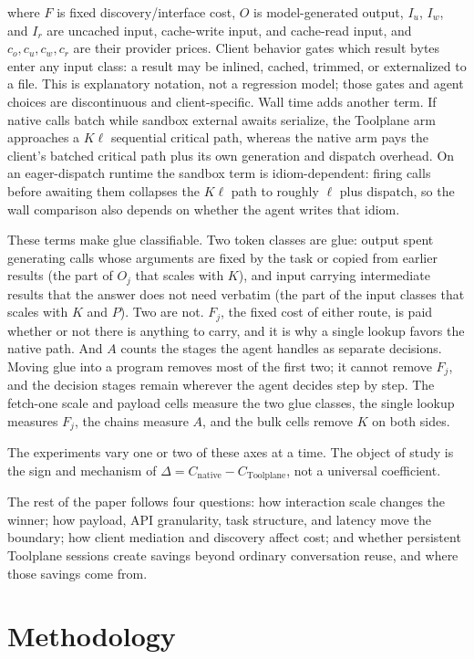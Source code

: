 \documentclass[10pt,twocolumn]{article}
\begin{document}
where $F$ is fixed discovery/interface cost, $O$ is model-generated output,
$I_u$, $I_w$, and $I_r$ are uncached input, cache-write input, and cache-read
input, and $c_o,c_u,c_w,c_r$ are their provider prices.  Client behavior gates
which result bytes enter any input class: a result may be inlined, cached,
trimmed, or externalized to a file.  This is explanatory notation, not a
regression model; those gates and agent choices are discontinuous and
client-specific.  Wall time adds another term.  If native calls batch while
sandbox external awaits serialize, the Toolplane arm approaches a $K\ell$
sequential critical path, whereas the native arm pays the client's batched
critical path plus its own generation and dispatch overhead.  On an
eager-dispatch runtime the sandbox term is idiom-dependent: firing calls
before awaiting them collapses the $K\ell$ path to roughly $\ell$ plus
dispatch, so the wall comparison also depends on whether the agent writes
that idiom.

These terms make glue classifiable.  Two token classes are glue: output
spent generating calls whose arguments are fixed by the task or copied from
earlier results (the part of $O_j$ that scales with $K$), and input carrying
intermediate results that the answer does not need verbatim (the part of the
input classes that scales with $K$ and $P$).  Two are not.  $F_j$, the fixed
cost of either route, is paid whether or not there is anything to carry, and
it is why a single lookup favors the native path.  And $A$ counts the stages
the agent handles as separate decisions.  Moving glue into a program removes
most of the first two; it cannot remove $F_j$, and the decision stages remain
wherever the agent decides step by step.  The fetch-one scale and payload
cells measure the two glue classes, the single lookup measures $F_j$, the
chains measure $A$, and the bulk cells remove $K$ on both sides.

The experiments vary one or two of these axes at a time.  The object of study
is the sign and mechanism of
$\Delta=C_{\mathrm{native}}-C_{\mathrm{Toolplane}}$, not a universal coefficient.

The rest of the paper follows four questions: how interaction scale changes the
winner; how payload, API granularity, task structure, and latency move the
boundary; how client mediation and discovery affect cost; and whether
persistent Toolplane sessions create savings beyond ordinary conversation
reuse, and where those savings come from.

\section{Methodology}
\label{sec:methods}
\end{document}
